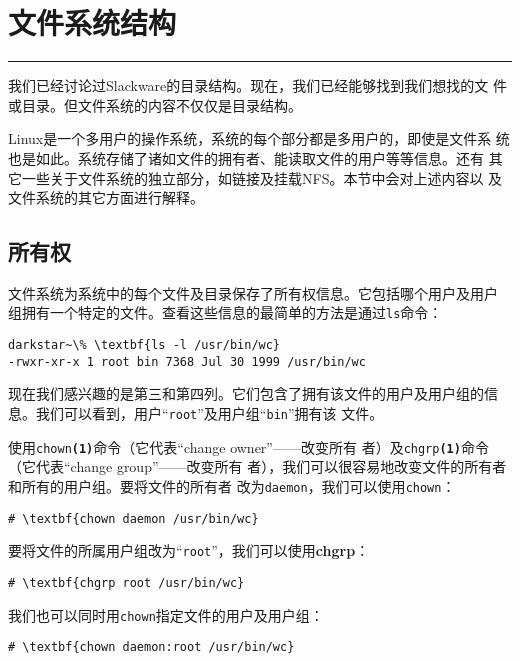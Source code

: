 
\chapter{文件系统结构}
\label{chap:filesystemStructure}

\begin{flushleft}
\rule[0mm]{\textwidth}{.1pt}
\end{flushleft}

我们已经讨论过Slackware的目录结构。现在，我们已经能够找到我们想找的文
件或目录。但文件系统的内容不仅仅是目录结构。

Linux是一个多用户的操作系统，系统的每个部分都是多用户的，即使是文件系
统也是如此。系统存储了诸如文件的拥有者、能读取文件的用户等等信息。还有
其它一些关于文件系统的独立部分，如链接及挂载NFS。本节中会对上述内容以
及文件系统的其它方面进行解释。

\section{所有权}
\label{sec:filesystemStructure:owenership}
文件系统为系统中的每个文件及目录保存了所有权信息。它包括哪个用户及用户
组拥有一个特定的文件。查看这些信息的最简单的方法是通过\texttt{ls}命令：
\begin{Verbatim}[frame=single, commandchars=\\\{\}]
darkstar~\% \textbf{ls -l /usr/bin/wc}
-rwxr-xr-x 1 root bin 7368 Jul 30 1999 /usr/bin/wc
\end{Verbatim}
现在我们感兴趣的是第三和第四列。它们包含了拥有该文件的用户及用户组的信
息。我们可以看到，用户``\texttt{root}''及用户组``\texttt{bin}''拥有该
文件。

使用\texttt{chown\textbf{(1)}}命令（它代表``change owner''——改变所有
者）及\texttt{chgrp\textbf{(1)}}命令（它代表``change group''——改变所有
者），我们可以很容易地改变文件的所有者和所有的用户组。要将文件的所有者
改为\texttt{daemon}，我们可以使用\texttt{chown}：
\begin{Verbatim}[frame=single, commandchars=\\\{\}]
# \textbf{chown daemon /usr/bin/wc}
\end{Verbatim}
要将文件的所属用户组改为``\texttt{root}''，我们可以使用\textbf{chgrp}：
\begin{Verbatim}[frame=single, commandchars=\\\{\}]
# \textbf{chgrp root /usr/bin/wc}
\end{Verbatim}

我们也可以同时用\texttt{chown}指定文件的用户及用户组：
\begin{Verbatim}[frame=single, commandchars=\\\{\}]
# \textbf{chown daemon:root /usr/bin/wc}
\end{Verbatim}

